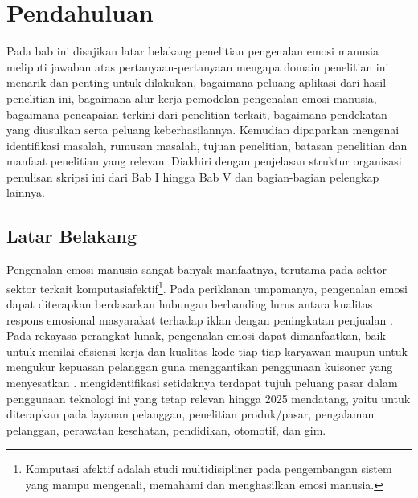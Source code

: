 \chapter{Pendahuluan}
Pada bab ini disajikan latar belakang penelitian pengenalan emosi manusia meliputi jawaban atas pertanyaan-pertanyaan mengapa domain penelitian ini menarik dan penting untuk dilakukan, bagaimana peluang aplikasi dari hasil penelitian ini, bagaimana alur kerja pemodelan pengenalan emosi manusia, bagaimana pencapaian terkini dari penelitian terkait, bagaimana pendekatan yang diusulkan serta peluang keberhasilannya. Kemudian dipaparkan mengenai identifikasi masalah, rumusan masalah, tujuan penelitian, batasan penelitian dan manfaat penelitian yang relevan. Diakhiri dengan penjelasan struktur organisasi penulisan skripsi ini dari Bab I hingga Bab V dan bagian-bagian pelengkap lainnya.

\section{Latar Belakang}
Pengenalan emosi manusia sangat banyak manfaatnya, terutama pada sektor-sektor terkait \gls{komputasiafektif}\footnote{Komputasi afektif adalah studi multidisipliner pada pengembangan sistem yang mampu mengenali, memahami dan menghasilkan emosi manusia.}. Pada periklanan umpamanya, pengenalan emosi dapat diterapkan berdasarkan hubungan berbanding lurus antara kualitas respons emosional masyarakat terhadap iklan dengan peningkatan penjualan . Pada rekayasa perangkat lunak, pengenalan emosi dapat dimanfaatkan, baik untuk menilai efisiensi kerja dan kualitas kode tiap-tiap karyawan maupun untuk mengukur kepuasan pelanggan guna menggantikan penggunaan kuisoner yang menyesatkan .  mengidentifikasi setidaknya terdapat tujuh peluang pasar dalam penggunaan teknologi ini yang tetap relevan hingga 2025 mendatang, yaitu untuk diterapkan pada layanan pelanggan, penelitian produk/pasar, pengalaman pelanggan, perawatan kesehatan, pendidikan, otomotif, dan gim.

